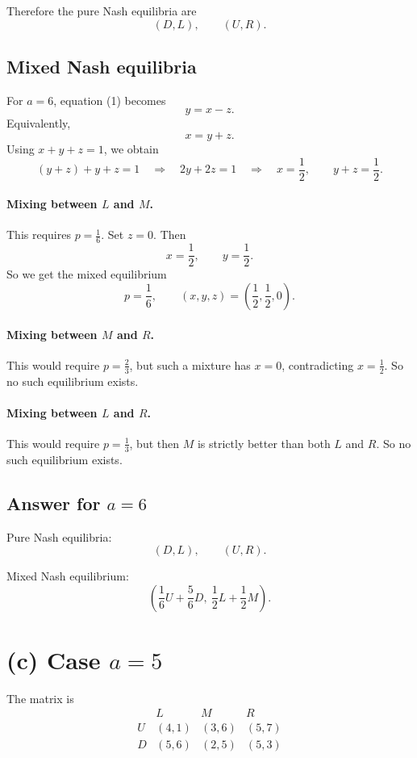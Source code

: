 Therefore the pure Nash equilibria are
\[
(D,L),\qquad (U,R).
\]

\subsection*{Mixed Nash equilibria}

For \(a=6\), equation (1) becomes
\[
y=x-z. \tag{3}
\]
Equivalently,
\[
x=y+z.
\]
Using \(x+y+z=1\), we obtain
\[
(y+z)+y+z=1
\quad\Rightarrow\quad
2y+2z=1
\quad\Rightarrow\quad
x=\frac12,\qquad y+z=\frac12.
\]

\paragraph{Mixing between \(L\) and \(M\).}
This requires \(p=\frac16\). Set \(z=0\). Then
\[
x=\frac12,\qquad y=\frac12.
\]
So we get the mixed equilibrium
\[
p=\frac16,\qquad (x,y,z)=\left(\frac12,\frac12,0\right).
\]

\paragraph{Mixing between \(M\) and \(R\).}
This would require \(p=\frac23\), but such a mixture has \(x=0\), contradicting \(x=\frac12\). So no such equilibrium exists.

\paragraph{Mixing between \(L\) and \(R\).}
This would require \(p=\frac13\), but then \(M\) is strictly better than both \(L\) and \(R\). So no such equilibrium exists.

\subsection*{Answer for \(a=6\)}

Pure Nash equilibria:
\[
(D,L),\qquad (U,R).
\]

Mixed Nash equilibrium:
\[
\left(\frac16 U+\frac56 D,\ \frac12 L+\frac12 M\right).
\]

\section*{(c) Case \(a=5\)}

The matrix is
\[
\begin{array}{c|ccc}
 & L & M & R\\
\hline
U & (4,1) & (3,6) & (5,7)\\
D & (5,6) & (2,5) & (5,3)
\end{array}
\]

